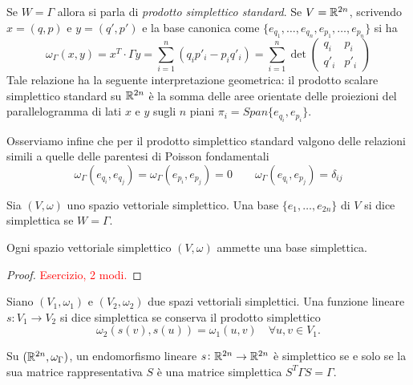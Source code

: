 Se $ W = \Gamma $ allora si parla di \emph{prodotto simplettico standard}. Se $ V = \mathbb{R}^{2n} $, scrivendo $ x = (q, p) $ e $ y = (q', p') $ e la base canonica come $ \{e_{q_1}, \ldots, e_{q_n}, e_{p_1}, \ldots, e_{p_n}\} $ si ha
\begin{equation}
    \omega_\Gamma(x, y) = x^T \cdot \Gamma y = \sum_{i=1}^{n} \left(q_i p'_i - p_i q'_i\right) =
    \sum_{i=1}^{n}
    \det{
    \begin{pmatrix}
    q_i & p_i \\
    q'_i & p'_i
    \end{pmatrix}
    }
\end{equation}
Tale relazione ha la seguente interpretazione geometrica: il prodotto scalare simplettico standard su $ \mathbb{R}^{2n} $ è la somma delle aree orientate delle proiezioni del parallelogramma di lati $ x $ e $ y $ sugli $ n $ piani $ \pi_i = Span\{e_{q_i}, e_{p_i}\} $.

Osserviamo infine che per il prodotto simplettico standard valgono delle relazioni simili a quelle delle parentesi di Poisson fondamentali
\begin{equation}
    \omega_\Gamma(e_{q_i}, e_{q_j}) = \omega_\Gamma(e_{p_i}, e_{p_j}) = 0 \qquad \omega_\Gamma(e_{q_i}, e_{p_j}) = \delta_{ij}
\end{equation}

\begin{definition}
    Sia $ (V, \omega) $ uno spazio vettoriale simplettico. Una base $ \{e_1, \ldots, e_{2n}\} $ di $ V $ si dice simplettica se $ W = \Gamma $.
\end{definition}

\begin{thm}
    Ogni spazio vettoriale simplettico $ (V, \omega) $ ammette una base simplettica.
\end{thm}
\begin{proof}
    \textcolor{red}{Esercizio, 2 modi.}
\end{proof}

\begin{definition}
    Siano $ (V_1, \omega_1) $ e $ (V_2, \omega_2) $ due spazi vettoriali simplettici. Una funzione lineare $ s \colon V_1 \to V_2 $ si dice simplettica se conserva il prodotto simplettico
    \[
        \omega_2(s(v), s(u)) = \omega_1(u, v) \quad \forall u, v \in V_1.
    \]
\end{definition}

\begin{proposition}
    Su $ (\mathbb{R}^{2n}, \omega_\Gamma) $, un endomorfismo lineare $ s \colon \mathbb{R}^{2n} \to \mathbb{R}^{2n} $ è simplettico se e solo se la sua matrice rappresentativa $ S $ è una matrice simplettica $ S^T \Gamma S = \Gamma $.
\end{proposition}

